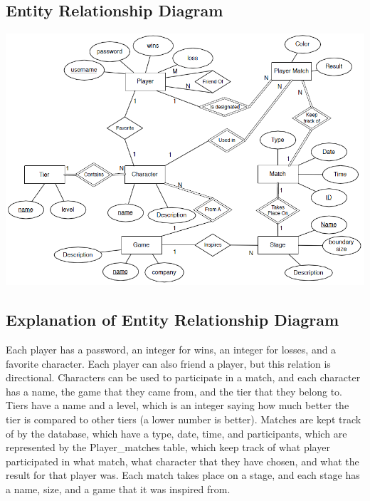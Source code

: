 \documentclass{article}
\begin{document}
\subsection{Entity Relationship Diagram}
\includegraphics[keepaspectratio, width=6in]{ER.png}\\
\subsection{Explanation of Entity Relationship Diagram}
Each player has a password, an integer for wins, an integer for losses, and a favorite character. Each player can also friend a player, but this relation is directional. Characters can be used to participate in a match, and each character has a name, the game that they came from, and the tier that they belong to. Tiers have a name and a level, which is an integer saying how much better the tier is compared to other tiers (a lower number is better). Matches are kept track of by the database, which have a type, date, time, and participants, which are represented by the Player\_matches table, which keep track of what player participated in what match, what character that they have chosen, and what the result for that player was. Each match takes place on a stage, and each stage has a name, size, and a game that it was inspired from.
\clearpage
\end{document}
